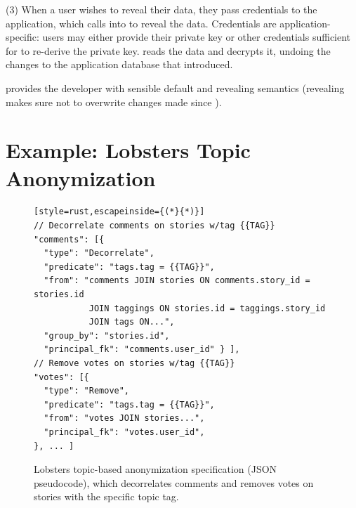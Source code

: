 %
(3) When a user wishes to reveal their \xxed data, they pass credentials
to the application, which calls into \sys to reveal the data.
%
Credentials are application-specific: users may either provide their private
key or other credentials sufficient for \sys to re-derive the private key.
%
\sys reads the \xxed data and decrypts it, undoing the changes to the
application database that \xxing introduced.

%
\sys provides the developer with sensible default \xxing and revealing
semantics (\eg revealing makes sure not to overwrite changes made since
\xxing).

\section{Example: Lobsters Topic Anonymization}
\label{s:design:lobsters}

\begin{figure}[t]
\centering
\begin{lstlisting}[style=rust,escapeinside={(*}{*)}]
// Decorrelate comments on stories w/tag {{TAG}}
"comments": [{
  "type": "Decorrelate",
  "predicate": "tags.tag = {{TAG}}",
  "from": "comments JOIN stories ON comments.story_id = stories.id
           JOIN taggings ON stories.id = taggings.story_id
           JOIN tags ON...",
  "group_by": "stories.id",
  "principal_fk": "comments.user_id" } ],
// Remove votes on stories w/tag {{TAG}}
"votes": [{
  "type": "Remove",
  "predicate": "tags.tag = {{TAG}}",
  "from": "votes JOIN stories...",
  "principal_fk": "votes.user_id",
}, ... ]
\end{lstlisting}
    \caption{Lobsters topic-based anonymization \xx specification (JSON
    pseudocode), which decorrelates comments and removes votes on stories with
    the specific topic tag.}
\label{f:spec}
\end{figure}

